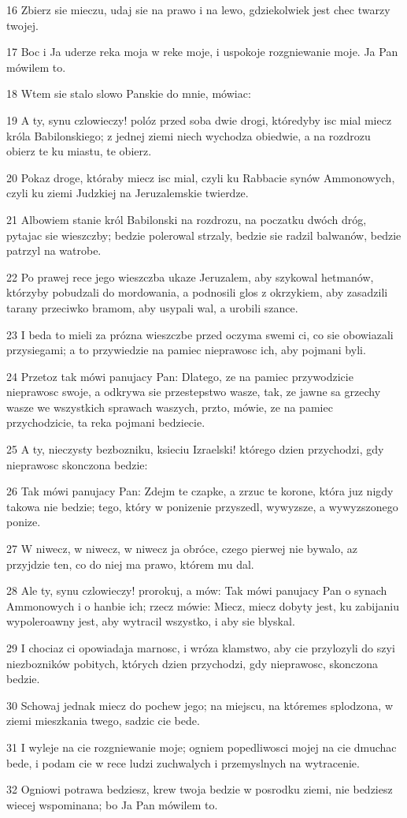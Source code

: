 \par 16 Zbierz sie mieczu, udaj sie na prawo i na lewo, gdziekolwiek jest chec twarzy twojej.
\par 17 Boc i Ja uderze reka moja w reke moje, i uspokoje rozgniewanie moje. Ja Pan mówilem to.
\par 18 Wtem sie stalo slowo Panskie do mnie, mówiac:
\par 19 A ty, synu czlowieczy! polóz przed soba dwie drogi, któredyby isc mial miecz króla Babilonskiego; z jednej ziemi niech wychodza obiedwie, a na rozdrozu obierz te ku miastu, te obierz.
\par 20 Pokaz droge, któraby miecz isc mial, czyli ku Rabbacie synów Ammonowych, czyli ku ziemi Judzkiej na Jeruzalemskie twierdze.
\par 21 Albowiem stanie król Babilonski na rozdrozu, na poczatku dwóch dróg, pytajac sie wieszczby; bedzie polerowal strzaly, bedzie sie radzil balwanów, bedzie patrzyl na watrobe.
\par 22 Po prawej rece jego wieszczba ukaze Jeruzalem, aby szykowal hetmanów, którzyby pobudzali do mordowania, a podnosili glos z okrzykiem, aby zasadzili tarany przeciwko bramom, aby usypali wal, a urobili szance.
\par 23 I beda to mieli za prózna wieszczbe przed oczyma swemi ci, co sie obowiazali przysiegami; a to przywiedzie na pamiec nieprawosc ich, aby pojmani byli.
\par 24 Przetoz tak mówi panujacy Pan: Dlatego, ze na pamiec przywodzicie nieprawosc swoje, a odkrywa sie przestepstwo wasze, tak, ze jawne sa grzechy wasze we wszystkich sprawach waszych, przto, mówie, ze na pamiec przychodzicie, ta reka pojmani bedziecie.
\par 25 A ty, nieczysty bezbozniku, ksieciu Izraelski! którego dzien przychodzi, gdy nieprawosc skonczona bedzie:
\par 26 Tak mówi panujacy Pan: Zdejm te czapke, a zrzuc te korone, która juz nigdy takowa nie bedzie; tego, który w ponizenie przyszedl, wywyzsze, a wywyzszonego ponize.
\par 27 W niwecz, w niwecz, w niwecz ja obróce, czego pierwej nie bywalo, az przyjdzie ten, co do niej ma prawo, którem mu dal.
\par 28 Ale ty, synu czlowieczy! prorokuj, a mów: Tak mówi panujacy Pan o synach Ammonowych i o hanbie ich; rzecz mówie: Miecz, miecz dobyty jest, ku zabijaniu wypoleroawny jest, aby wytracil wszystko, i aby sie blyskal.
\par 29 I chociaz ci opowiadaja marnosc, i wróza klamstwo, aby cie przylozyli do szyi niezbozników pobitych, których dzien przychodzi, gdy nieprawosc, skonczona bedzie.
\par 30 Schowaj jednak miecz do pochew jego; na miejscu, na któremes splodzona, w ziemi mieszkania twego, sadzic cie bede.
\par 31 I wyleje na cie rozgniewanie moje; ogniem popedliwosci mojej na cie dmuchac bede, i podam cie w rece ludzi zuchwalych i przemyslnych na wytracenie.
\par 32 Ogniowi potrawa bedziesz, krew twoja bedzie w posrodku ziemi, nie bedziesz wiecej wspominana; bo Ja Pan mówilem to.

